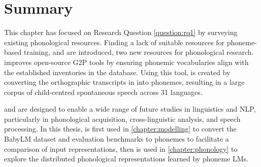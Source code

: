 \section{Summary}

This chapter has focused on Research Question \ref{question:rq1} by surveying existing phonological resources. Finding a lack of suitable resources for phoneme-based training, \gpp and \ipachildes are introduced, two new resources for phonological research. \gpp improves open-source G2P tools by ensuring phonemic vocabularies align with the established inventories in the \phoible database. Using this tool, \ipachildes is created by converting the orthographic transcripts in \childes into phonemes, resulting in a large corpus of child-centred spontaneous speech across 31 languages.

\gpp and \ipachildes are designed to enable a wide range of future studies in linguistics and NLP, particularly in phonological acquisition, cross-linguistic analysis, and speech processing. In this thesis, \gpp is first used in \cref{chapter:modelling} to convert the BabyLM dataset and evaluation benchmarks to phonemes to facilitate a comparison of input representations, then \ipachildes is used in \cref{chapter:phonology} to explore the distributed phonological representations learned by phoneme LMs. 












